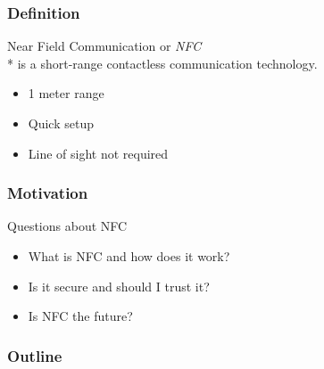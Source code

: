 \documentclass[unknownkeysallowed]{beamer}
\begin{document}
\begin{frame}
\frametitle{Definition}
  \begin{center}
    {\LARGE \textcolor{uipoppy}{Near Field Communication or \textit{NFC}}}\\*
	is a short-range contactless communication technology.
    \begin{minipage}{.6\textwidth}
      \vspace{3mm}
      \pause
			\begin{itemize}
        	\item{1 meter range}
        	\item{Quick setup}
        	\item{Line of sight not required}
   		\end{itemize}
    \end{minipage}

  \end{center}
\end{frame}

\begin{frame}
\frametitle{Motivation}
  \begin{center}
    \begin{minipage}{.7\textwidth}
  	 \begin{block}{Questions about NFC}
        \begin{itemize}
  		    \item{What is NFC and how does it work?}
  		    \item{Is it secure and should I trust it?}
  		    \item{Is NFC the future?}
     		\end{itemize}
     \end{block}
    \end{minipage}
  \end{center}
\end{frame}

\begin{frame}
  \frametitle{Outline}
    \begin{center}\begin{minipage}{.9\textwidth}
        \tableofcontents[
          currentsection,
          sectionstyle=show/show,
          subsectionstyle=show/shaded/hide
        ]
    \end{minipage}\end{center}
 \end{frame}


\Fontix

\end{document}
